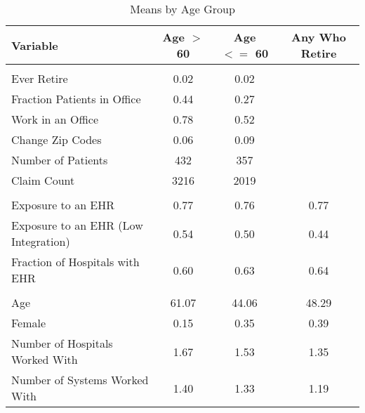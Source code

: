 \begin{table}[p]
\caption{Means by Age Group}
\centering
\begin{tabular}[t]{lccc}
\toprule
Variable & Age $>$ 60 & Age $<=$ 60 & Any Who Retire\\
\midrule
\addlinespace[0.3em]
\multicolumn{4}{l}{\textbf{Outcomes}}\\
\hspace{1em}Ever Retire & 0.02 & 0.02 \\
\hspace{1em}Fraction Patients in Office & 0.44 & 0.27 \\
\hspace{1em}Work in an Office & 0.78 & 0.52 \\
\hspace{1em}Change Zip Codes & 0.06 & 0.09 \\
\hspace{1em}Number of Patients & 432 & 357\\
\hspace{1em}Claim Count & 3216 & 2019\\
\addlinespace[0.3em]
\multicolumn{4}{l}{\textbf{Treatment}}\\
\hspace{1em}Exposure to an EHR & 0.77 & 0.76 & 0.77\\
\hspace{1em}Exposure to an EHR (Low Integration) & 0.54 & 0.50 & 0.44\\
\hspace{1em}Fraction of Hospitals with EHR & 0.60 & 0.63 & 0.64\\
\addlinespace[0.3em]
\multicolumn{4}{l}{\textbf{Characteristics}}\\
\hspace{1em}Age & 61.07 & 44.06 & 48.29\\
\hspace{1em}Female & 0.15 & 0.35 & 0.39\\
\hspace{1em}Number of Hospitals Worked With & 1.67 & 1.53 & 1.35\\
\hspace{1em}Number of Systems Worked With & 1.40 & 1.33 & 1.19\\
\bottomrule
\end{tabular}
\label{tab:splitstats}
\end{table}
